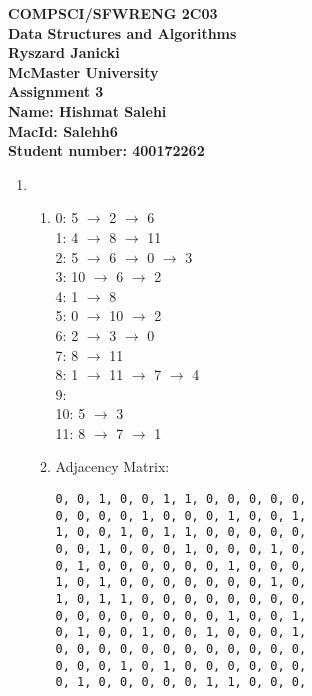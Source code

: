 \documentclass[11pt,fleqn]{article}
\begin{document}
\begin{center}

  {\large \textbf{COMPSCI/SFWRENG 2C03}}\\[2mm]
  {\large \textbf{Data Structures and Algorithms}}\\[2mm]
  {\large \textbf{Ryszard Janicki}}\\[2mm]
  {\large \textbf{McMaster University}}\\[6mm]
  {\huge \textbf{Assignment 3}}\\[6mm]
  {\large \textbf{Name: Hishmat Salehi}}\\[2mm]
  {\large \textbf{MacId: Salehh6}}\\[2mm]
  {\large \textbf{Student number: 400172262}}\\[2mm]


\end{center}

\medskip

\begin{enumerate}
	\item 	
		\begin{enumerate}
			\item 
0: 5 $\rightarrow$ 2 $\rightarrow$ 6 \\
1: 4 $\rightarrow$ 8 $\rightarrow$ 11 \\
2: 5 $\rightarrow$ 6 $\rightarrow$ 0 $\rightarrow$ 3 \\
3: 10 $\rightarrow$ 6 $\rightarrow$ 2 \\
4: 1 $\rightarrow$ 8 \\
5: 0 $\rightarrow$ 10 $\rightarrow$ 2 \\
6: 2 $\rightarrow$ 3 $\rightarrow$ 0 \\
7: 8 $\rightarrow$ 11 \\
8: 1 $\rightarrow$ 11 $\rightarrow$ 7 $\rightarrow$ 4 \\
9: \\
10: 5 $\rightarrow$ 3 \\
11: 8 $\rightarrow$ 7 $\rightarrow$ 1
			\item Adjacency Matrix:
\begin{verbatim}
0, 0, 1, 0, 0, 1, 1, 0, 0, 0, 0, 0, 
0, 0, 0, 0, 1, 0, 0, 0, 1, 0, 0, 1, 
1, 0, 0, 1, 0, 1, 1, 0, 0, 0, 0, 0, 
0, 0, 1, 0, 0, 0, 1, 0, 0, 0, 1, 0, 
0, 1, 0, 0, 0, 0, 0, 0, 1, 0, 0, 0, 
1, 0, 1, 0, 0, 0, 0, 0, 0, 0, 1, 0, 
1, 0, 1, 1, 0, 0, 0, 0, 0, 0, 0, 0, 
0, 0, 0, 0, 0, 0, 0, 0, 1, 0, 0, 1, 
0, 1, 0, 0, 1, 0, 0, 1, 0, 0, 0, 1, 
0, 0, 0, 0, 0, 0, 0, 0, 0, 0, 0, 0, 
0, 0, 0, 1, 0, 1, 0, 0, 0, 0, 0, 0, 
0, 1, 0, 0, 0, 0, 0, 1, 1, 0, 0, 0, 
\end{verbatim}
		\end{enumerate}
\end{enumerate}
\end{document}
